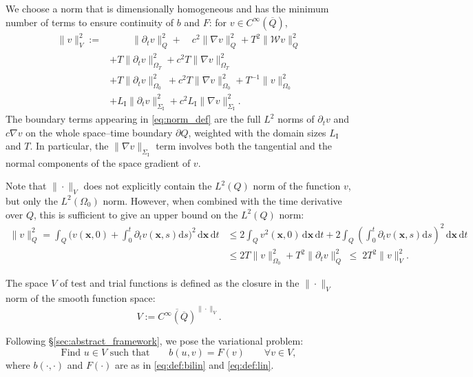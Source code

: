 \documentclass[a4paper]{article}
\theoremstyle{plain}
\theoremstyle{definition}
\newcommand{\operator}[1]{\mathcal{#1}}
\newcommand{\dx}{{\,\mathrm{d}\vect x}}
\newcommand{\dt}{{\,\mathrm{d}t}}
\newcommand{\Grad}[1]{\nabla #1}
\newcommand{\TimeDer}{{\partial^{}_t}}
\newcommand{\vect}[1]{\bm{#1}}
\newcommand{\LI}{L_{\mathrm I}}
\newcommand{\SI}{{\Sigma_{\mathrm I}}}
\newcommand{\vx}{{\vect x}}
\newcommand{\OZ}{{\Omega_0}}
\begin{document}
We choose a norm that is dimensionally homogeneous and has the minimum number of terms to ensure continuity of $b$ and $F$:
for $v \in C^{\infty}(\overline{Q})$,
\begin{equation}
	\label{eq:norm_def}
	\begin{split}
		\|v\|_V^2 :=& \qquad\; \|\TimeDer{v}\|_{Q}^2 + \quad c^2\|\Grad v\|_Q^2 + T^2 \|\operator{W} v\|_Q^2 \\
		& + T \|\TimeDer{v}\|_{\Omega_T}^2 + c^2 T \|\Grad v\|_{\Omega_T}^2 \\
		& + T \|\TimeDer{v}\|_{\Omega_0}^2 \:+ c^2 T \|\Grad v\|_{\Omega_0}^2 + T^{-1}\|v\|_{\OZ}^2 \\
		& + \LI \|\TimeDer{v}\|_{\SI}^2 + c^2 \LI \|\Grad v\|_{\SI}^2 .
	\end{split}
\end{equation}
The boundary terms appearing in \eqref{eq:norm_def} are the full $L^2$ norms of $\TimeDer v$ and $c\Grad v$ on the whole space--time boundary $\partial Q$, weighted with the domain sizes $\LI$ and $T$.
In particular, the $\|\Grad v\|_{\SI}$ term involves both the tangential and the normal components of the space gradient of $v$.

Note that $\|\cdot\|_V$ does not explicitly contain the $L^2(Q)$ norm of the function $v$, but only the $L^2(\OZ)$ norm.
However, when combined with the time derivative over $Q$, this is sufficient to give an upper bound on the $L^2(Q)$ norm:
\begin{align}\nonumber
	\|v\|_Q^2=
	\int_Q\Big(v(\vx,0)+\int_0^t \TimeDer v(\vx,s) \mathrm ds\Big)^2\dx\dt
& \leq 2 \int_Q v^2(\vx, 0) \dx \dt +  2 \int_Q \left( \int_0^t \TimeDer v (\vx,s)\mathrm{d}s \right)^2 \dx \dt \\
    & \leq 2T \|v\|_\OZ^2 + T^2\|\TimeDer v\|_Q^2
	\;\leq\; 2 T^2 \|v\|_V^2.
	\label{eq:L2V}
\end{align}

The space $V$ of test and trial functions is defined as the closure in the $\|\cdot\|_V$ norm of the smooth function space:
\begin{equation}\label{eq:space_def}
	V := \overline{C^\infty(\overline Q)}^{\|\cdot\|_V}.
\end{equation}

Following \S\ref{sec:abstract_framework}, we pose the variational problem:
\begin{equation}   \label{eq:vpV}
	\text{Find $u \in V$ such that}\qquad     b(u,v) = F(v) \qquad \forall v \in V,
\end{equation}
where $b(\cdot,\cdot)$ and $F(\cdot)$ are as in \eqref{eq:def:bilin} and \eqref{eq:def:lin}.
\end{document}
